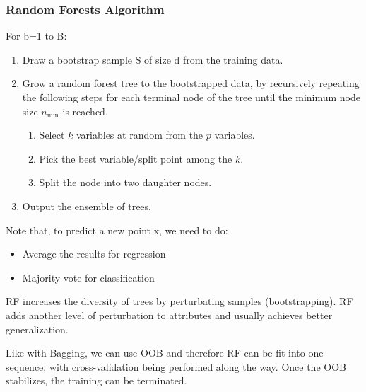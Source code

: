 \documentclass[letterpaper,12pt]{article}
\begin{document}
\subsubsection{Random Forests Algorithm}
For b=1 to B:
\begin{enumerate}
    \item Draw a bootstrap sample S of size d from the training data. 
    \item Grow a random forest tree to the bootstrapped data, by recursively repeating the following steps for each terminal node of the tree until the minimum node size $n_{\min}$ is reached.
    \begin{enumerate}
        \item Select $k$ variables at random from the $p$ variables.
        \item Pick the best variable/split point among the $k$.
        \item Split the node into two daughter nodes.
    \end{enumerate}
    \item Output the ensemble of trees.
\end{enumerate}
 Note that, to predict a new point x, we need to do:
 \begin{itemize}
    \item Average the results for regression
    \item Majority vote for classification
 \end{itemize}

 RF increases the diversity of trees by perturbating samples (bootstrapping). RF adds another level of perturbation to attributes and usually achieves better generalization. 

 Like with Bagging, we can use OOB and therefore RF can be fit into one sequence, with cross-validation being performed along the way. Once the OOB stabilizes, the training can be terminated. 
\end{document}
